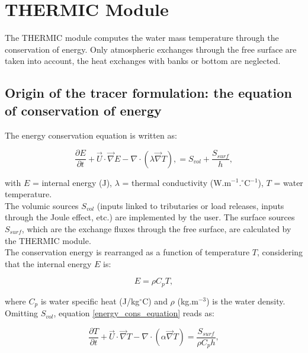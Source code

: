 \chapter{THERMIC Module}

The THERMIC module computes the water mass temperature through the conservation of energy.
Only atmospheric exchanges through the free surface are taken into account,
the heat exchanges with banks or bottom are neglected.\\

\section{Origin of the tracer formulation: the equation of conservation of energy}

The energy conservation equation is written as:

\begin{equation}
  \label{energy_cons_equation}
  \frac{\partial E}{\partial t} + \vec{U} \cdot \vec \nabla E
  - \nabla \cdot \left( \lambda \vec \nabla T \right),
  = S_{vol} + \frac{S_{surf}}{h},
\end{equation}

with $E$ = internal energy (J), $\lambda$ = thermal conductivity (W.m$^{-1}$.$^{\circ}$C$^{-1}$),
$T$ = water temperature.\\

The volumic sources $S_{vol}$
(inputs linked to tributaries or load releases, inputs through the Joule effect, etc.) are
implemented by the user. The surface sources $S_{surf}$,
which are the exchange fluxes through the free surface,
are calculated by the THERMIC module.\\

The conservation energy is rearranged as a function of temperature $T$,
considering that the internal energy $E$ is:

\begin{equation}
  E = \rho C_p T,
\end{equation}

where $C_p$ is water specific heat (J/kg$^{\circ}$C)
and $\rho$ (kg.m$^{-3}$) is the water density.
Omitting $S_{vol}$, equation \ref{energy_cons_equation} reads as:

\begin{equation}
  \frac{\partial T}{\partial t} + \vec{U} \cdot \vec \nabla T
  - \nabla \cdot \left( \alpha \vec \nabla T \right)
  = \frac{S_{surf}}{\rho C_p h},
\end{equation}

